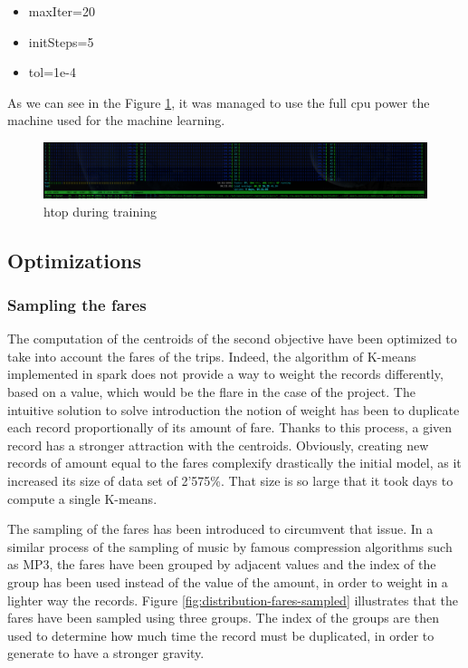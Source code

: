 \documentclass[a4paper]{article}
\begin{document}
\begin{itemize}
  \item maxIter=20
  \item initSteps=5
  \item tol=1e-4
\end{itemize}

As we can see in the Figure \ref{fig:ml-cpus-max}, it was managed to use the full cpu power the machine used for the machine learning.

\begin{figure}
  \centering
  \includegraphics[width=1\textwidth]{images/htop-full-cpus.png}
  \caption{htop during training}
  \label{fig:ml-cpus-max}
\end{figure}

\subsection{Optimizations}
\subsubsection{Sampling the fares}
The computation of the centroids of the second objective have been optimized to take into account the fares of the trips. Indeed, the algorithm of K-means implemented in spark does not provide a way to weight the records differently, based on a value, which would be the flare in the case of the project. The intuitive solution to solve introduction the notion of weight has been to duplicate each record proportionally of its amount of fare. Thanks to this process, a given record has a stronger attraction with the centroids. Obviously, creating new records of amount equal to the fares complexify drastically the initial model, as it increased its size of data set of 2'575\%. That size is so large that it took days to compute a single K-means.

The sampling of the fares has been introduced to circumvent that issue. In a similar process of the sampling of music by famous compression algorithms such as MP3, the fares have been grouped by adjacent values and the index of the group has been used instead of the value of the amount, in order to weight in a lighter way the records. Figure \ref{fig:distribution-fares-sampled} illustrates that the fares have been sampled using three groups. The index of the groups are then used to determine how much time the record must be duplicated, in order to generate to have a stronger gravity.
\end{document}
